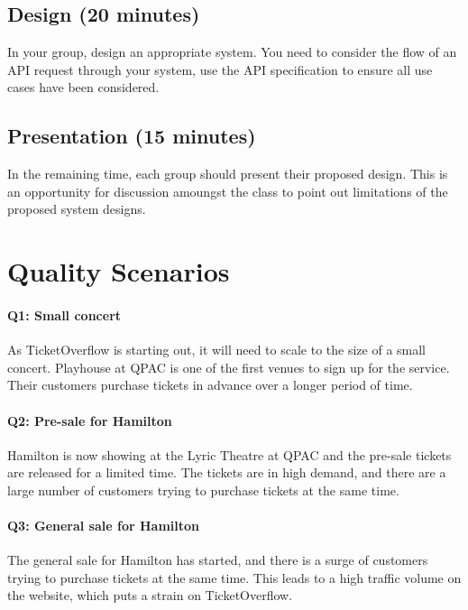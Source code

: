 \documentclass{csse4400}
\begin{document}

\subsection*{Design (20 minutes)}

In your group, design an appropriate system.
You need to consider the flow of an API request through your system,
use the API specification to ensure all use cases have been considered.

\subsection*{Presentation (15 minutes)}

In the remaining time,
each group should present their proposed design.
This is an opportunity for discussion amoungst the class to point out limitations of the proposed system designs.

\section{Quality Scenarios}\label{sec:scenarios}

\paragraph{Q1: Small concert}
As TicketOverflow is starting out,
it will need to scale to the size of a small concert.
Playhouse at QPAC is one of the first venues to sign up for the service.
Their customers purchase tickets in advance over a longer period of time.

\paragraph{Q2: Pre-sale for Hamilton}
Hamilton is now showing at the Lyric Theatre at QPAC and the pre-sale tickets are released for a limited time.
The tickets are in high demand, and there are a large number of customers trying to purchase tickets at the same time.

\paragraph{Q3: General sale for Hamilton}
The general sale for Hamilton has started, and there is a surge of customers trying to purchase tickets at the same time.
This leads to a high traffic volume on the website, which puts a strain on TicketOverflow.
\end{document}
